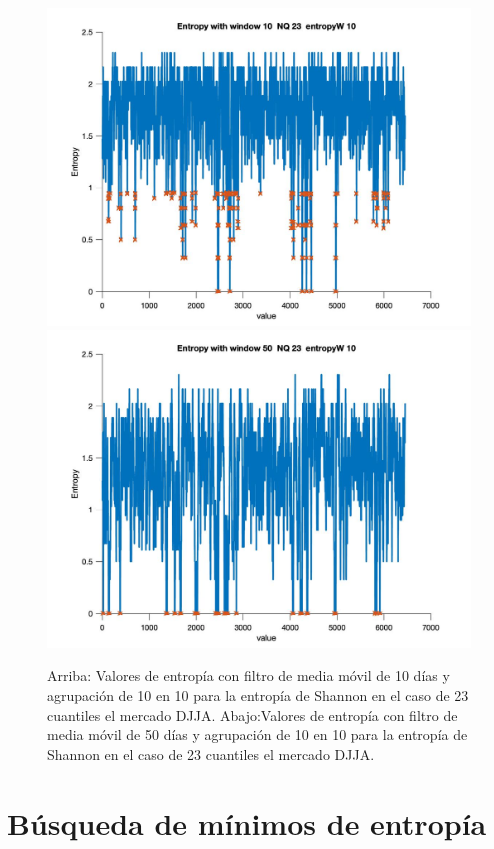 \begin{figure}[h!]
	\centering
	\includegraphics[width=12cm]{figures_matlab/Entropy_window_10_NQ_23_entropyW_10.jpg}
		\includegraphics[width=12cm]{figures_matlab/Entropy_window_50_NQ_23_entropyW_10.jpg}
	\caption{Arriba: Valores de entropía con filtro de media móvil de 10 días y agrupación de 10 en 10 para la entropía de Shannon en el caso de 23 cuantiles el mercado DJJA.
	Abajo:Valores de entropía con filtro de media móvil de 50 días y agrupación de 10 en 10 para la entropía de Shannon en el caso de 23 cuantiles el mercado DJJA.}
	\label{mav10Entropy10nq23}
\end{figure}


\section{Búsqueda de mínimos de entropía}

